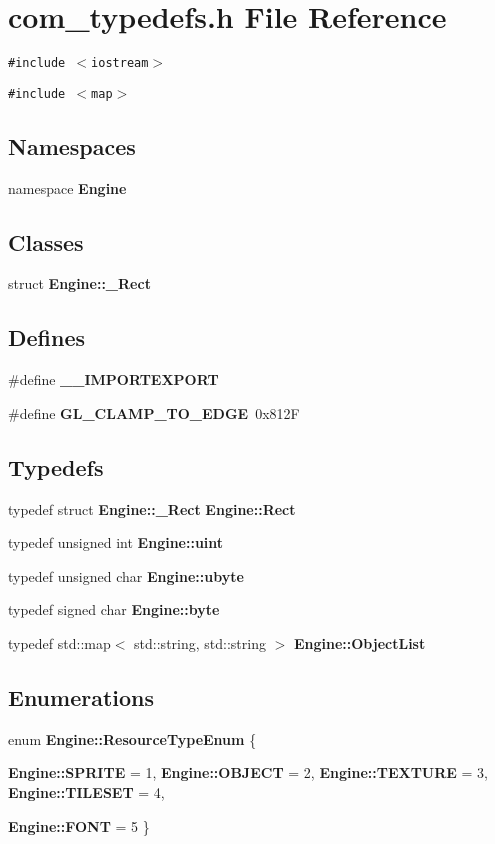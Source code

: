 \section{com\_\-typedefs.h File Reference}
\label{com__typedefs_8h}
{\tt \#include $<$iostream$>$}\par
{\tt \#include $<$map$>$}\par
\subsection*{Namespaces}
\begin{CompactItemize}
\item 
namespace {\bf Engine}
\end{CompactItemize}
\subsection*{Classes}
\begin{CompactItemize}
\item 
struct {\bf Engine::\_\-Rect}
\end{CompactItemize}
\subsection*{Defines}
\begin{CompactItemize}
\item 
\#define {\bf \_\-\_\-IMPORTEXPORT}
\item 
\#define {\bf GL\_\-CLAMP\_\-TO\_\-EDGE}~0x812F
\end{CompactItemize}
\subsection*{Typedefs}
\begin{CompactItemize}
\item 
typedef struct {\bf Engine::\_\-Rect} {\bf Engine::Rect}
\item 
typedef unsigned int {\bf Engine::uint}
\item 
typedef unsigned char {\bf Engine::ubyte}
\item 
typedef signed char {\bf Engine::byte}
\item 
typedef std::map$<$ std::string, std::string $>$ {\bf Engine::ObjectList}
\end{CompactItemize}
\subsection*{Enumerations}
\begin{CompactItemize}
\item 
enum {\bf Engine::ResourceTypeEnum} \{ \par
{\bf Engine::SPRITE} =  1, 
{\bf Engine::OBJECT} =  2, 
{\bf Engine::TEXTURE} =  3, 
{\bf Engine::TILESET} =  4, 
\par
{\bf Engine::FONT} =  5
 \}
\end{CompactItemize}
